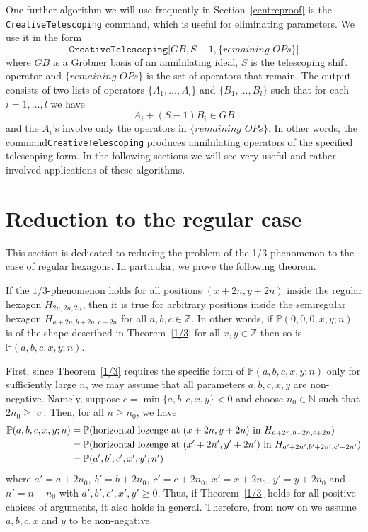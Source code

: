 \documentclass{amsart}
\numberwithin{equation}{section}
\newcommand*{\Z}{\mathbb{Z}}
\begin{document}
One further algorithm we will use frequently in Section~\ref{centreproof} is the \texttt{CreativeTelescoping} command, which is useful for eliminating parameters. We use it in the form
\[\texttt{CreativeTelescoping[}GB, S-1,\{\textit{remaining OPs}\}\texttt{]}\]
where $GB$ is a Gröbner basis of an annihilating ideal, $S$ is the telescoping shift operator and $\{\textit{remaining OPs}\}$ is the set of operators that remain. The output consists of two lists of operators $\{A_1,\dots,A_l\}$ and $\{B_1,\dots,B_l\}$ such that for each $i=1,\dots, l$ we have
\[A_i+(S-1)B_i \in GB\]
and the $A_i$'s involve only the operators in $\{\textit{remaining OPs}\}$. In other words, the command\break \texttt{CreativeTelescoping} produces annihilating operators of the specified telescoping form. In the following sections we will see very useful and rather involved applications of these algorithms.


\section{Reduction to the regular case}

This section is dedicated to reducing the problem of the 1/3-phenomenon to the case of regular hexagons. In particular, we prove the following theorem.

\begin{thm}
    If the $1/3$-phenomenon holds for all positions $(x+2n,y+2n)$ inside the regular hexagon $H_{2n,2n,2n}$, then it is true for arbitrary positions inside the semiregular hexagon $H_{a+2n,b+2n,c+2n}$ \/for all $a,b,c\in\Z$. In other words, if $\mathbb{P}(0,0,0,x,y;n)$ is of the shape described in Theorem~\ref{1/3} for all $x,y\in\Z$ then so is $\mathbb{P}(a,b,c,x,y;n)$. 
\end{thm}

First, since Theorem~\ref{1/3} requires the specific form of $\mathbb{P}(a,b,c,x,y;n)$ only for sufficiently large $n$, we may assume that all parameters $a,b,c,x,y$ are non-negative. Namely, suppose $c = \min\{a,b,c,x,y\} < 0$ and choose $n_0 \in \mathbb{N}$ such that $2n_0 \geq |c|$. Then, for all $n \ge n_0$, we have
\begin{align}
    \mathbb{P}(a,b,c,x,y;n)&=\mathbb{P}(\text{horizontal lozenge at }(x+2n,y+2n)\text{ in }H_{a+2n,b+2n,c+2n})\notag\\
    &=\mathbb{P}(\text{horizontal lozenge at }(x'+2n',y'+2n')\text{ in }H_{a'+2n',b'+2n',c'+2n'})\notag\\
    &=\mathbb{P}(a',b',c',x',y';n')\notag
\end{align}
where $a'=a+2n_0,\ b'=b+2n_0,\ c'=c+2n_0,\ x'=x+2n_0,\  y'=y+2n_0$ and $n'=n-n_0$ with $a',b',c',x',y'\geq 0$. Thus, if Theorem~\ref{1/3} holds for all positive choices of arguments, it also holds in general. Therefore, from now on we assume $a,b,c,x$ and $y$ to be non-negative.
\end{document}
